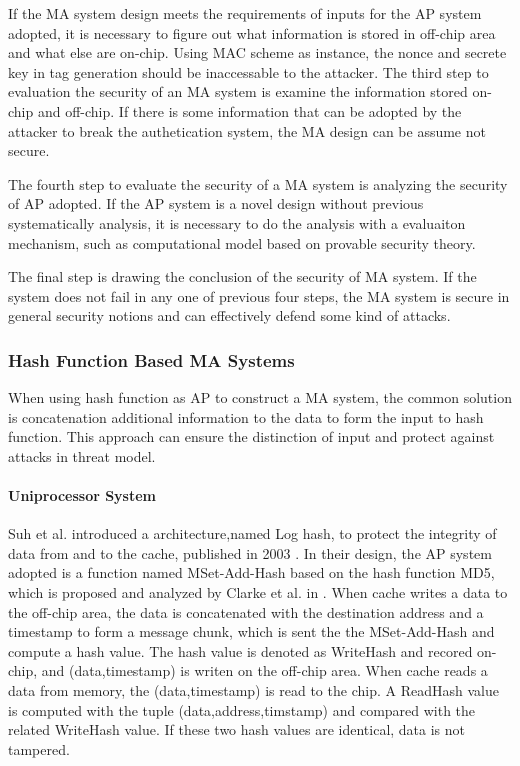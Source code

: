 \documentclass{article}
\begin{document}
If the MA system design meets the requirements of inputs for the AP system adopted, it is necessary to figure out what information is stored in off-chip area and what else are on-chip. Using MAC scheme as instance, the nonce and secrete key in tag generation should be inaccessable to the attacker.  
The third step to evaluation the security of an MA system is examine the information stored on-chip and off-chip. If there is some information that can be adopted by the attacker to break the authetication system, the MA design can be assume not secure.

The fourth step to evaluate the security of a MA system is analyzing the security of AP adopted. If the AP system is a novel design without previous systematically analysis, it is necessary to do the analysis with a evaluaiton mechanism, such as computational model based on provable security theory.

The final step is drawing the conclusion of the security of MA system. If the system does not fail in any one of previous four steps, the MA system is secure in general security notions and can effectively defend some kind of attacks.
 
\subsubsection{Hash Function Based MA Systems}
When using hash function as AP to construct a MA system, the common solution is concatenation additional information to the data to form the input to hash function. This approach can ensure the distinction of input and protect against attacks in threat model.
\paragraph{Uniprocessor System}
Suh et al. introduced a architecture,named Log hash, to protect the integrity of data from and to the cache, published in 2003 \cite{keylist}.
In their design, the AP system adopted is a function named MSet-Add-Hash based on the hash function MD5, which is proposed and analyzed by Clarke et al. in \cite{keylist}. When cache writes a data to the off-chip area, the data is concatenated with the destination address and a timestamp to form a message chunk, which is sent the the MSet-Add-Hash and compute a hash value. The hash value is denoted as WriteHash and recored on-chip, and (data,timestamp) is writen on the off-chip area.
When cache reads a data from memory, the (data,timestamp) is read to the chip. A ReadHash value is computed with the tuple (data,address,timstamp) and compared with the related WriteHash value. If these two hash values are identical, data is not tampered.
\end{document}
